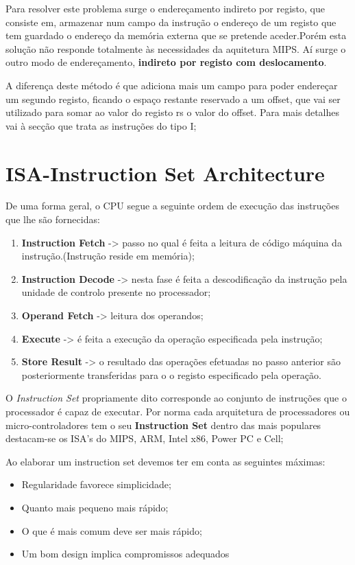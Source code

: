 \documentclass[10pt,a4paper]{book}
\begin{document}
			Para resolver este problema surge o endereçamento indireto por registo, que consiste em, armazenar num campo da instrução o endereço de um registo que tem guardado o endereço da memória externa que se pretende aceder.Porém esta solução não responde totalmente às necessidades da aquitetura MIPS. Aí surge o outro modo de endereçamento, \textbf{indireto por registo com deslocamento}.

			A diferença deste método é que adiciona mais um campo para poder endereçar um segundo registo,
			ficando o espaço restante reservado a um offset, que vai ser utilizado para somar ao valor do registo rs o valor do offset. Para mais detalhes vai à secção que trata as instruções do tipo I;










 \chapter{ISA-Instruction Set Architecture}

	De uma forma geral, o CPU segue a seguinte ordem de execução das instruções que lhe são fornecidas:
		\begin{enumerate}
			\item \textbf{Instruction Fetch} -> passo no qual é feita a leitura de código máquina da instrução.(Instrução reside em memória);
			\item \textbf{Instruction Decode} -> nesta fase é feita a descodificação da instrução pela unidade de controlo presente no processador;
			\item \textbf{Operand Fetch} -> leitura dos operandos;
			\item \textbf{Execute} -> é feita a execução da operação especificada pela instrução;
			\item \textbf{Store Result} -> o resultado das operações efetuadas no passo anterior são posteriormente transferidas para o o registo especificado pela operação.
		\end{enumerate}

	O \textit{Instruction Set} propriamente dito corresponde ao conjunto de instruções que o processador é capaz de executar.
	Por norma cada arquitetura de processadores ou micro-controladores tem o seu \textbf{Instruction Set} dentro das mais populares destacam-se os ISA's do MIPS, ARM, Intel x86, Power PC e Cell;

	Ao elaborar um instruction set devemos ter em conta as seguintes máximas:
	\begin{itemize}
		\item Regularidade favorece simplicidade;
		\item Quanto mais pequeno mais rápido;
		\item O que é mais comum deve ser mais rápido;
		\item Um bom design implica compromissos adequados
	\end{itemize}
\end{document}
